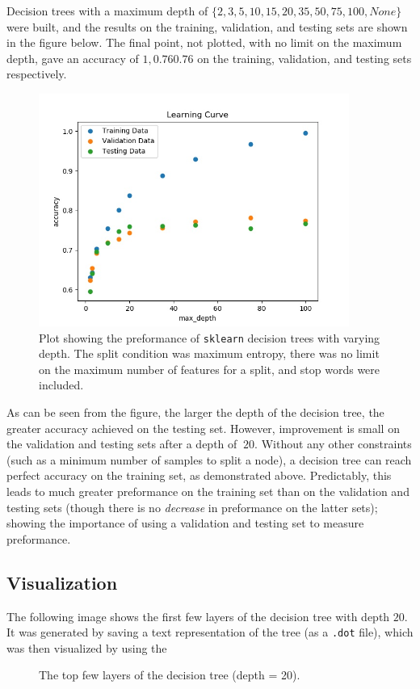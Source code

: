 \documentclass{article}
\begin{document}
   Decision trees with a maximum depth of $\{ 2, 3, 5, 10, 15, 20, 35, 50, 75, 100, None \}$ were built, and
   the results on the training, validation, and testing sets are shown in the figure below. The final point,
   not plotted, with no limit on the maximum depth, gave an accuracy of $1, 0.76 0.76$ on the training,
   validation, and testing sets respectively.
      \begin{figure}[h] \centering
         \includegraphics[width=4in]{resources/part7/part7a_splitCondition=entropy_maxFeatures=None_stopWords=True}

         \caption{Plot showing the preformance of \texttt{sklearn} decision trees with
            varying depth. The split condition was maximum entropy, there was no limit on the maximum
            number of features for a split, and stop words were included.}
      \end{figure}
   As can be seen from the figure, the larger the depth of the decision tree, the greater accuracy achieved on
   the testing set. However, improvement is small on the validation and testing sets after a depth of
   $~20$. Without any other constraints (such as a minimum number of samples to split a node), a decision tree
   can reach perfect accuracy on the training set, as demonstrated above. Predictably, this leads to
   much greater preformance on the training set than on the validation and testing sets (though there is no
   \textit{decrease} in preformance on the latter sets); showing the importance of using a validation and testing
   set to measure preformance.

   \subsection{Visualization}
   The following image shows the first few layers of the decision tree with depth $20$. It was generated by saving
   a text representation of the tree (as a \texttt{.dot} file), which was then visualized by using the
      \begin{figure}[h] \centering
         \caption{The top few layers of the decision tree (depth = 20).}
         \label{part7b}
      \end{figure}
\end{document}
